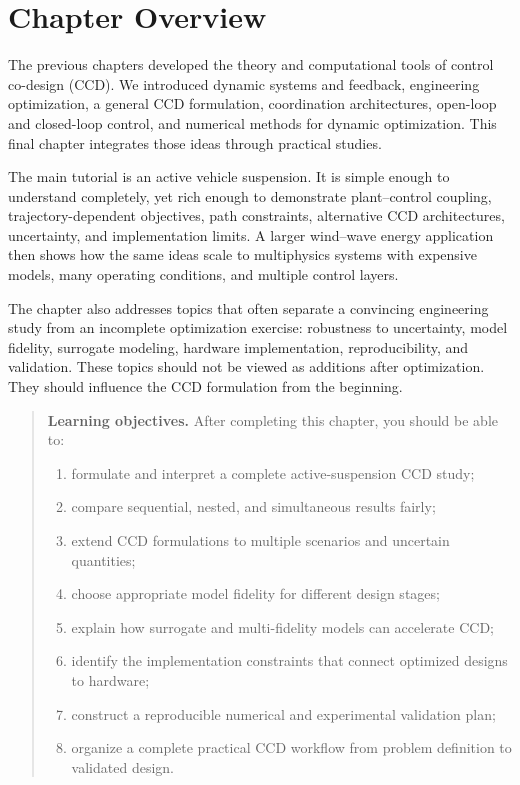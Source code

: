 \documentclass[11pt]{article}
\newenvironment{learningobjectives}{%
\begin{quote}\textbf{Learning objectives.} After completing this chapter, you should be able to:
\begin{enumerate}[leftmargin=1.4em,itemsep=0.35em,topsep=0.5em]
}{\end{enumerate}\end{quote}}
\begin{document}
\tableofcontents
\newpage

\section*{Chapter Overview}

The previous chapters developed the theory and computational tools of control co-design (CCD). We introduced dynamic systems and feedback, engineering optimization, a general CCD formulation, coordination architectures, open-loop and closed-loop control, and numerical methods for dynamic optimization. This final chapter integrates those ideas through practical studies.

The main tutorial is an active vehicle suspension. It is simple enough to understand completely, yet rich enough to demonstrate plant--control coupling, trajectory-dependent objectives, path constraints, alternative CCD architectures, uncertainty, and implementation limits. A larger wind--wave energy application then shows how the same ideas scale to multiphysics systems with expensive models, many operating conditions, and multiple control layers.

The chapter also addresses topics that often separate a convincing engineering study from an incomplete optimization exercise: robustness to uncertainty, model fidelity, surrogate modeling, hardware implementation, reproducibility, and validation. These topics should not be viewed as additions after optimization. They should influence the CCD formulation from the beginning.

\begin{learningobjectives}
  \item formulate and interpret a complete active-suspension CCD study;
  \item compare sequential, nested, and simultaneous results fairly;
  \item extend CCD formulations to multiple scenarios and uncertain quantities;
  \item choose appropriate model fidelity for different design stages;
  \item explain how surrogate and multi-fidelity models can accelerate CCD;
  \item identify the implementation constraints that connect optimized designs to hardware;
  \item construct a reproducible numerical and experimental validation plan;
  \item organize a complete practical CCD workflow from problem definition to validated design.
\end{learningobjectives}
\end{document}
